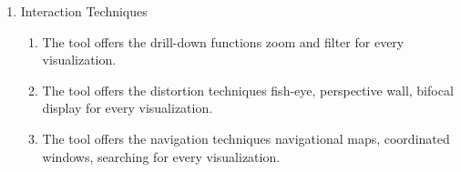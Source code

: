 \begin{enumerate} [noitemsep]
\item Interaction Techniques
\begin{enumerate}
\item The tool offers the drill-down functions zoom and filter for every visualization.
\item The tool offers the distortion techniques fish-eye, perspective wall, bifocal display for every visualization.
\item The tool offers the navigation techniques navigational maps, coordinated windows, searching for every visualization.
\end{enumerate}

\end{enumerate}
